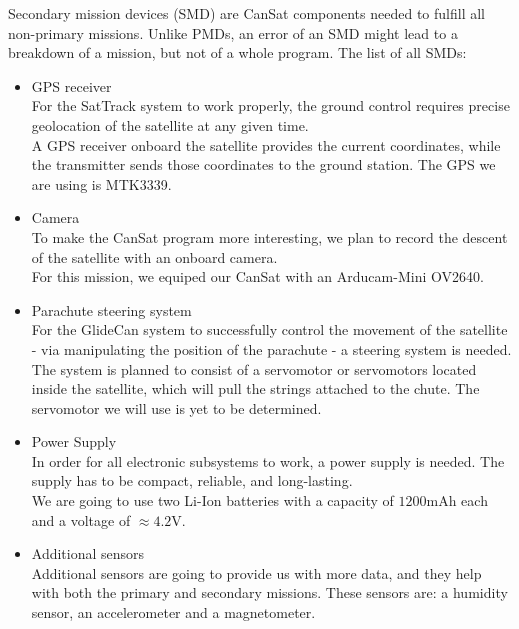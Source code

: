 \documentclass[class=report, crop=false]{standalone}
\begin{document}
  Secondary mission devices (SMD) are CanSat components needed to fulfill all non-primary missions.
  Unlike PMDs, an error of an SMD might lead to a breakdown of a mission, but not of a whole program.
  The list of all SMDs:
\begin{itemize}
\item GPS receiver \\
  For the SatTrack system to work properly, the ground control requires precise geolocation of the satellite at any given time. \\
  A GPS receiver onboard the satellite provides the current coordinates, while the transmitter sends those coordinates to the ground station. The GPS we are using is MTK3339.
\item Camera \\
  To make the CanSat program more interesting, we plan to record the descent of the satellite with an onboard camera. \\
  For this mission, we equiped our CanSat with an Arducam-Mini OV2640.

\item Parachute steering system \\
  For the GlideCan system to successfully control the movement of the satellite - via manipulating the position of the parachute - a steering system is needed. \\
  The system is planned to consist of a servomotor or servomotors located inside the satellite, which will pull the strings attached to the chute.
  The servomotor we will use is yet to be determined.

\item Power Supply \\
  In order for all electronic subsystems to work, a power supply is needed. The supply has to be compact, reliable, and long-lasting. \\
  We are going to use two Li-Ion batteries with a capacity of $1200$mAh each and a voltage of $\approx 4.2\text{V}$.

\item Additional sensors \\
  Additional sensors are going to provide us with more data, and they help with both the primary and secondary missions.
  These sensors are: a humidity sensor, an accelerometer and a magnetometer.

\end{itemize}
\end{document}
